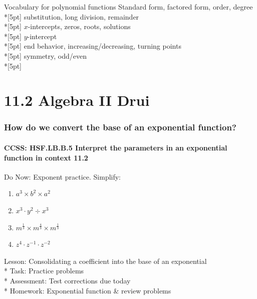 \documentclass{beamer}
\begin{document}
\begin{frame}{Vocabulary for polynomial functions}
    Standard form, factored form, order, degree\\*[5pt]
    substitution, long division, remainder\\*[5pt]
    $x$-intercepts, zeros, roots, solutions\\*[5pt]
    $y$-intercept\\*[5pt]
    end behavior, increasing/decreasing, turning points\\*[5pt]
    symmetry, odd/even\\*[5pt]
\end{frame}

\section{11.2 Algebra II Drui}
\frame
{
  \frametitle{How do we convert the base of an exponential function?}
  \framesubtitle{CCSS: HSF.LB.B.5 Interpret the parameters in an exponential function in context \qquad \alert{11.2}}

  \begin{block}{Do Now: Exponent practice. Simplify:}
  \begin{enumerate}
      \item $a^3 \times b^2 \times a^2$
      \item $x^3 \cdot y^2 \div x^3$
      \item $\displaystyle m^\frac{1}{3} \times m^\frac{4}{3} \times m^\frac{1}{3}$
      \item $z^4 \cdot z^{-1} \cdot z^{-2}$
  \end{enumerate}
  \end{block}
  Lesson: Consolidating a coefficient into the base of an exponential\\*
  Task: Practice problems\\*
  Assessment: Test corrections due today\\*
  Homework: Exponential function \& review problems\\
}
\end{document}

